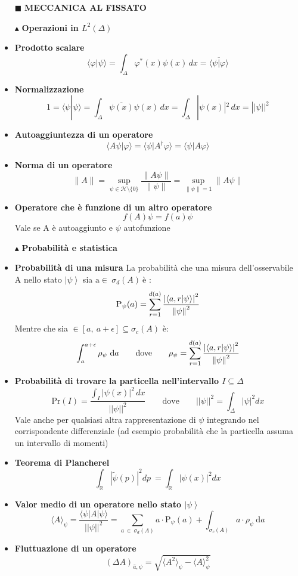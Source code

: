 \documentclass{book}
\newcommand{\g}{\textbf}
\newcommand{\e}{\begin{equation}}
\newcommand{\ex}{\end{equation} }
\renewcommand{\it}{\item[$\cdot$]}
\begin{document}
\begin{multicols}{4}

\begin{itemize}
\item [$\blacksquare$] \g{MECCANICA AL FISSATO}
\item [$\blacktriangle$] \g{Operazioni in $L^2(\Delta)$}
    \it \g{Prodotto scalare}
        \e{\langle \varphi | \psi \rangle = \int_{\Delta} \varphi^*(x) \psi(x) \, dx = \overline{\langle \psi | \varphi \rangle}} \ex
    \it \g{Normalizzazione }
        \e{1 = \langle \psi | \psi \rangle = \int_{\Delta} \overline{\psi(x)}\psi(x) \, dx = \int_{\Delta} |\psi(x)|^2 \, dx = ||\psi||^{2}}     \ex
    \it \g{Autoaggiuntezza di un operatore}
        \e{\langle A\psi | \varphi \rangle = \langle \psi | A^\dagger \varphi \rangle = \langle \psi | A \varphi \rangle} \ex
    \it \g{Norma di un operatore}
        \e{\|A\| = \sup_{\psi \in \mathcal{H} \setminus \{0\}} \frac{\|A\psi\|}{\|\psi\|} = \sup_{\|\psi\|=1} \|A\psi\|} \ex
    \it \g{Operatore che è funzione di un altro operatore}
        \e{f(A)\psi = f(a)\psi}\ex
        Vale se A è autoaggiunto e $\psi$ autofunzione
    \item [$\blacktriangle$] \g{Probabilità e statistica}
    \it \g{Probabilità di una misura}
    La probabilità che una misura dell'osservabile A nello stato $\left|\psi\right>$ sia $\text{a} \in \ \sigma_{d}(A) \  \text{è}  $ :
            \e{ {\text{P}_{\psi}(a)} = \sum_{r=1}^{d(a)}\frac{\left| \braket{a,r}{\psi} \right|^{2}}{\norm{\psi}^{2}}} \ex
       Mentre che sia $\in [a, \ a + \epsilon] \subseteq \sigma_{c}(A)$ è:    
\e{\int_{a}^{a+\epsilon}\rho_{\psi}\ \text{d}a \qquad  \text{dove} \qquad \rho_{\psi} = \sum_{r=1}^{d(a)}\frac{\left| \braket{a,r}{\psi} \right|^{2}}{\norm{\psi}^{2}}}\ex

\it \g{Probabilità di trovare la particella nell'intervallo $I \subseteq \Delta$}
        \e{\mathrm{Pr}(I) = \frac{\int_I |\psi(x)|^2\, dx}{||\psi||^{2}} \qquad \text{dove} \qquad ||\psi||^{2} =\int_{\Delta}|\psi|^{2}dx } \ex
Vale anche per qualsiasi altra rappresentazione di $\psi$ integrando nel corrispondente differenziale (ad esempio probabilità che la particella assuma un intervallo di momenti)

    \it \g{Teorema di Plancherel}
\e{\int_{\mathbb{R}}|\tilde{\psi}(p)|^{2}dp \   = \int_{\mathbb{R}}|\psi(x)|^{2}dx }\ex

        \it \g{Valor medio di un operatore nello stato $\left|\psi\right>$}
            \e{\langle A \rangle_{\psi}   =  \frac{\langle \psi | A | \psi \rangle}{||\psi||^{2}} = \sum_{a \ \in \ \sigma_{d}(A)}a \cdot \text{P}_{\psi}(a) + \int_{\sigma_{c}(A)} a \cdot \rho_{\psi}\ \text{d}a} \ex
        \it \g{Fluttuazione di un operatore}
        \e{(\Delta A)_{\hat{a}, \psi} = \sqrt{ \langle A^2 \rangle_\psi - \langle A \rangle_\psi^2}} \ex
        

\end{itemize}
\end{multicols}
\end{document}

